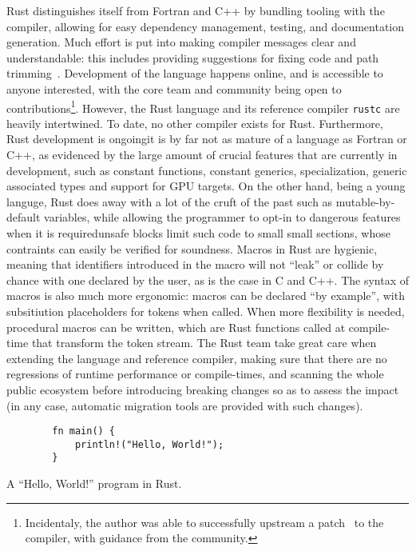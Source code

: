 \documentclass[british]{scrreprt}
\begin{document}
Rust distinguishes itself from Fortran and C++ by bundling tooling with the compiler, allowing for easy dependency management, testing, and documentation generation. Much effort is put into making compiler messages clear and understandable: this includes providing suggestions for fixing code and path trimming~\cite{AloniPathTrimmingNightly2020}. Development of the language happens online, and is accessible to anyone interested, with the core team and community being open to contributions\footnote{Incidentaly, the author was able to successfully upstream a patch~\cite{SudwojNVPTXsupportnew2020} to the compiler, with guidance from the community.}. However, the Rust language and its reference compiler \texttt{rustc} are heavily intertwined. To date, no other compiler exists for Rust. Furthermore, Rust development is ongoing\textemdash{}it is by far not as mature of a language as Fortran or C++, as evidenced by the large amount of crucial features that are currently in development, such as constant functions, constant generics, specialization, generic associated types and support for GPU targets. On the other hand, being a young languge, Rust does away with a lot of the cruft of the past such as mutable-by-default variables, while allowing the programmer to opt-in to dangerous features when it is required\textemdash{}unsafe blocks limit such code to small small sections, whose contraints can easily be verified for soundness. Macros in Rust are hygienic, meaning that identifiers introduced in the macro will not \enquote{leak} or collide by chance with one declared by the user, as is the case in C and C++. The syntax of macros is also much more ergonomic: macros can be declared \enquote{by example}, with subsitiution placeholders for tokens when called. When more flexibility is needed, procedural macros can be written, which are Rust functions called at compile-time that transform the token stream. The Rust team take great care when extending the language and reference compiler, making sure that there are no regressions of runtime performance or compile-times, and scanning the whole public ecosystem before introducing breaking changes so as to assess the impact (in any case, automatic migration tools are provided with such changes).

\begin{listing}
	\centering
	\begin{verbatim}
		fn main() {
			println!("Hello, World!");
		}
	\end{verbatim}
	\caption{A \enquote{Hello, World!} program in Rust.}
\end{listing}
\end{document}
